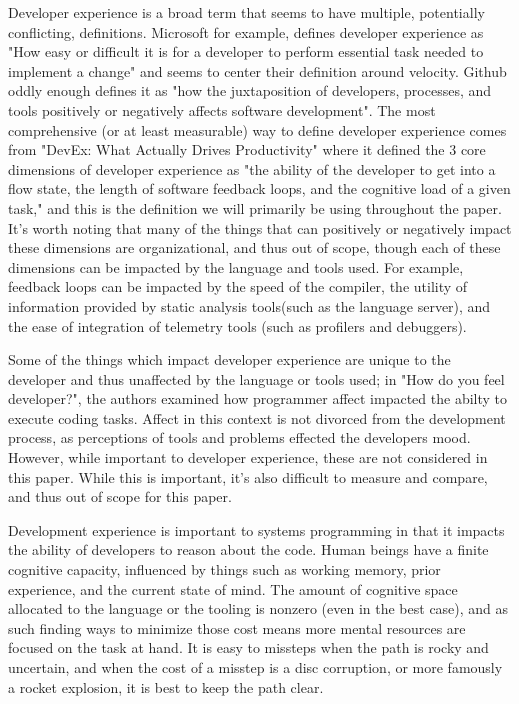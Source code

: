 \documentclass[conference]{IEEEtran}
\begin{document}
 {Developer experience is a broad term that seems to have multiple, potentially conflicting, definitions. Microsoft for example, defines developer experience as "How easy or difficult it is for a developer to perform essential task needed to implement a change"\cite{DeveloperExperienceDevEx} and seems to center their definition around velocity. Github oddly enough defines it as "how the juxtaposition of developers, processes, and tools positively or negatively affects software development"\cite{davisDeveloperExperienceWhat2023}.
  The most comprehensive (or at least measurable) way to define developer experience comes from "DevEx: What Actually Drives Productivity"\cite{nodaDevExWhatActually2023} where it defined the 3 core dimensions of developer experience as "the ability of the developer to get into a flow state, the length of software feedback loops, and the cognitive load of a given task," and this is the definition we will primarily be using throughout the paper. It's worth noting that many of the things that can positively or negatively impact these dimensions are organizational, and thus out of scope, though each of these dimensions can be impacted by the language and tools used. For example, feedback loops can be impacted by the speed of the compiler,
  the utility of information provided by static analysis tools(such as the language server), and the ease of integration of telemetry tools (such as profilers and debuggers).
 }

 {
  Some of the things which impact developer experience are unique to the developer and thus unaffected by the language or tools used; in "How do you feel developer?"\cite{graziotin2015you}, the authors examined how programmer
  affect impacted the abilty to execute coding tasks. Affect in this context is not divorced from the development process, as perceptions of tools and problems effected the developers mood. However, while
  important to developer experience, these are not considered in this paper. While this is important, it's also difficult to measure and compare, and thus out of scope for this paper.
 }

 {
  Development experience is important to systems programming in that it impacts the ability of developers to reason about the code. Human beings have a finite cognitive capacity, influenced by things such as working memory, prior experience, and the current state of mind. The amount of cognitive space allocated to the language or the tooling is nonzero (even in the best case), and as such finding ways to minimize those cost means more mental resources are focused on the task at hand. It is easy to missteps when the path is rocky and uncertain, and when the cost of a misstep is a disc corruption\cite{larabelItLooksThere2016}, or more famously a rocket explosion\cite{dowsonArianeSoftwareFailure1997}, it is best to keep the path clear.
 }
\end{document}
